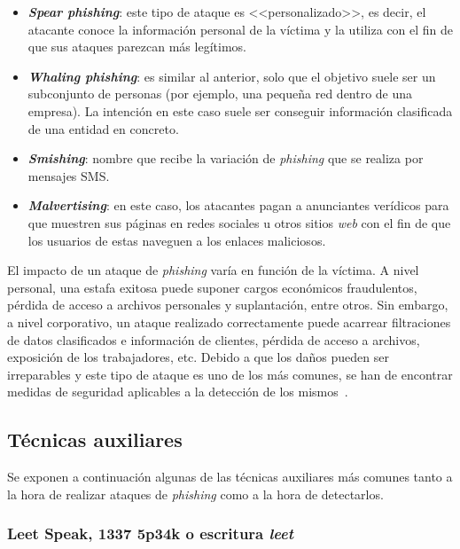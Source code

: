 \begin{itemize}
	\item \textbf{\textit{Spear phishing}}: este tipo de ataque es <<personalizado>>, es decir, el atacante conoce la información personal de la víctima y la utiliza con el fin de que sus ataques parezcan más legítimos.
	
	\item \textbf{\textit{Whaling phishing}}: es similar al anterior, solo que el objetivo suele ser un subconjunto de personas (por ejemplo, una pequeña red dentro de una empresa). La intención en este caso suele ser conseguir información clasificada de una entidad en concreto.
	\item \textbf{\textit{Smishing}}: nombre que recibe la variación de \textit{phishing} que se realiza por mensajes SMS.
	\item \textbf{\textit{Malvertising}}: en este caso, los atacantes pagan a anunciantes verídicos para que muestren sus páginas en redes sociales u otros sitios \textit{web} con el fin de que los usuarios de estas naveguen a los enlaces maliciosos.
\end{itemize}

El impacto de un ataque de \textit{phishing} varía en función de la víctima. A nivel personal, una estafa exitosa puede suponer cargos económicos fraudulentos, pérdida de acceso a archivos personales y suplantación, entre otros. Sin embargo, a nivel corporativo, un ataque realizado correctamente puede acarrear filtraciones de datos clasificados e información de clientes, pérdida de acceso a archivos, exposición de los trabajadores, etc. Debido a que los daños pueden ser irreparables y este tipo de ataque es uno de los más comunes, se han de encontrar medidas de seguridad aplicables a la detección de los mismos~\cite{phishingMicrosoft}.

\subsection{Técnicas auxiliares}

Se exponen a continuación algunas de las técnicas auxiliares más comunes tanto a la hora de realizar ataques de \textit{phishing} como a la hora de detectarlos.

\subsubsection{Leet Speak, 1337 5p34k o escritura \textit{leet}}


